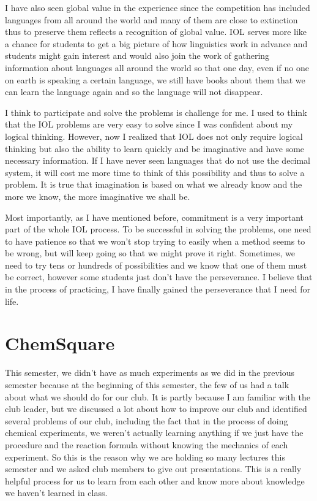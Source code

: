 \documentclass[11pt,a4paper,titlepage]{article}
\begin{document}
I have also seen global value in the experience since the competition has included languages from all around the world and many of them are close to extinction thus to preserve them reflects a recognition of global value. IOL serves more like a chance for students to get a big picture of how linguistics work in advance and students might gain interest and would also join the work of gathering information about languages all around the world so that one day, even if no one on earth is speaking a certain language, we still have books about them that we can learn the language again and so the language will not disappear.

I think to participate and solve the problems is challenge for me. I used to think that the IOL problems are very easy to solve since I was confident about my logical thinking. However, now I realized that IOL does not only require logical thinking but also the ability to learn quickly and be imaginative and have some necessary information. If I have never seen languages that do not use the decimal system, it will cost me more time to think of this possibility and thus to solve a problem. It is true that imagination is based on what we already know and the more we know, the more imaginative we shall be.

Most importantly, as I have mentioned before, commitment is a very important part of the whole IOL process. To be successful in solving the problems, one need to have patience so that we won’t stop trying to easily when a method seems to be wrong, but will keep going so that we might prove it right. Sometimes, we need to try tens or hundreds of possibilities and we know that one of them must be correct, however some students just don’t have the perseverance. I believe that in the process of practicing, I have finally gained the perseverance that I need for life.

\section{ChemSquare}
This semester, we didn’t have as much experiments as we did in the previous semester
because at the beginning of this semester, the few of us had a talk about what we should do for our club. It is partly because I am familiar with the club leader, but we discussed a lot about how to improve our club and identified several problems of our club, including the fact that in the process of doing chemical experiments, we weren’t actually learning anything if we just have the procedure and the reaction formula without knowing the mechanics of each experiment. So this is the reason why we are holding so many lectures this semester and we asked club members to give out presentations. This is a really helpful process for us to learn from each other and know more about knowledge we haven’t learned in class.
\end{document}
